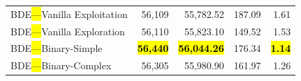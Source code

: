 \documentclass[mathematics,article,accept,moreauthors]{Definitions/mdpi}
\begin{document}
\begin{table}[H]
\begin{tabularx}{\textwidth}{lRRRR}
    \midrule
    BDE\hl{---}Vanilla Exploitation  &          56,109 &         55,782.52 & 187.09 &         1.61 \\
    BDE\hl{---}Vanilla Exploration   &          56,110 &         55,823.10 & 149.52 &         1.53 \\
    BDE\hl{---}Binary-Simple         & \textbf{\hl{56,440}} & \textbf{\hl{56,044.26}} & 176.34 & \textbf{\hl{1.14}} \\
    BDE\hl{---}Binary-Complex        &          56,305 &         55,980.90 & 161.97 &         1.26 \\
    \bottomrule
  \end{tabularx}
\end{table}

\vspace{-9pt}

\end{document}

